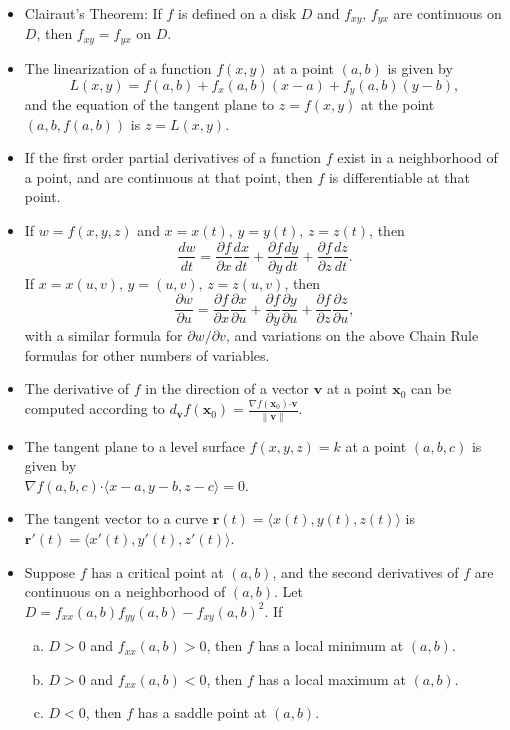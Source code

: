 \documentclass[12pt]{article}
\newcommand{\di}{\displaystyle}
\newcommand{\pd}[2]{\dfrac{\partial #1}{\partial #2}}
\newcommand{\rd}[2]{\dfrac{d #1}{d #2}}
\newcommand{\dotp}{\boldsymbol{\cdot}}
\begin{document}
\begin{itemize}

\item Clairaut's Theorem: If $f$ is defined on a disk $D$ and $f_{xy},\, f_{yx}$ are continuous on $D$, then $f_{xy}=f_{yx}$ on $D$.
\item The linearization of a function $f(x,y)$ at a point $(a,b)$ is given by
\[
L(x,y) = f(a,b)+f_x(a,b)(x-a)+f_y(a,b)(y-b),
\]
and the equation of the tangent plane to $z=f(x,y)$ at the point $(a,b,f(a,b))$ is $z=L(x,y)$.
\item If the first order partial derivatives of a function $f$ exist in a neighborhood of a point, and are continuous at that point, then $f$ is differentiable at that point.
\item If $w=f(x,y,z)$ and $x=x(t),\, y=y(t),\, z=z(t)$, then
\[
\frac{dw}{dt} = \pd{f}{x}\rd{x}{t}+\pd{f}{y}\rd{y}{t}+\pd{f}{z}\rd{z}{t}.
\]
If $x=x(u,v), \, y=(u,v),\, z=z(u,v)$, then
\[
\pd{w}{u} = \pd{f}{x}\pd{x}{u}+\pd{f}{y}\pd{y}{u}+\pd{f}{z}\pd{z}{u},
\]
with a similar formula for $\partial w/\partial v$, and variations on the above Chain Rule formulas for other numbers of variables.
\item The derivative of $f$ in the direction of a vector $\mathbf{v}$ at a point $\mathbf{x}_0$ can be computed according to $\di d_{\mathbf{v}}f(\mathbf{x}_0) = \frac{\nabla f(\mathbf{x}_0)\dotp \mathbf{v}}{\lVert\mathbf{v}\rVert}$.
\item The tangent plane to a level surface $f(x,y,z)=k$ at a point $(a,b,c)$ is given by \\$\nabla f(a,b,c)\dotp\langle x-a, y-b, z-c\rangle = 0$.
\item The tangent vector to a curve $\mathbf{r}(t) = \langle x(t),y(t),z(t)\rangle$ is $\mathbf{r}'(t) = \langle x'(t), y'(t), z'(t)\rangle$.
\item Suppose $f$ has a critical point at $(a,b)$, and the second derivatives of $f$ are continuous on a neighborhood of $(a,b)$. Let $D = f_{xx}(a,b)f_{yy}(a,b)-f_{xy}(a,b)^2$. If
\begin{enumerate}[(a)]
\item $D>0$ and $f_{xx}(a,b)>0$, then $f$ has a local minimum at $(a,b)$.
\item $D>0$ and $f_{xx}(a,b)<0$, then $f$ has a local maximum at $(a,b)$.
\item $D<0$, then $f$ has a saddle point at $(a,b)$.
\end{enumerate}

\end{itemize}
\end{document}
